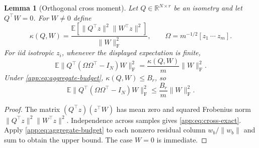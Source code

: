 \documentclass[11pt,a4paper]{article}
\newtheorem{lemma}[theorem]{Lemma}
\theoremstyle{definition}\newtheorem{definition}[theorem]{Definition}
\theoremstyle{remark}\newtheorem{remark}[theorem]{Remark}
\numberwithin{equation}{section}
\newcommand{\R}{\mathbb R}\newcommand{\E}{\mathbb E}\newcommand{\Pp}{\mathbb P}
\newcommand{\Id}{I}\newcommand{\F}{\mathrm F}
\newcommand{\norm}[1]{\lVert#1\rVert}\newcommand{\ip}[2]{\langle#1,#2\rangle}
\begin{document}
\begin{lemma}[Orthogonal cross moment]\label{app:lem:cross}
Let $Q\in\R^{N\times r}$ be an isometry and let $Q^\top W=0$.
For $W\ne0$ define
\begin{equation}\label{app:eq:mixed-parameter}
 \kappa(Q,W)=
 \frac{\E[\norm{Q^\top z}^2\norm{W^\top z}^2]}{\norm W_\F^2},
 \qquad \Omega=m^{-1/2}[z_1\ \cdots\ z_m].
\end{equation}
For iid isotropic $z_i$, whenever the displayed expectation is finite,
\begin{equation}\label{app:eq:cross-exact}
 \E\norm{Q^\top(\Omega\Omega^\top-\Id_N)W}_\F^2
 =\frac{\kappa(Q,W)}m\norm W_\F^2.
\end{equation}
Under \eqref{app:eq:aggregate-budget}, $\kappa(Q,W)\le B_r$, so
\begin{equation}\label{app:eq:cross}
 \E\norm{Q^\top(\Omega\Omega^\top-\Id_N)W}_\F^2
 \le\frac{B_r}{m}\norm W_\F^2.
\end{equation}
\end{lemma}
\begin{proof}
The matrix $(Q^\top z)(z^\top W)$ has mean zero and squared Frobenius
norm $\norm{Q^\top z}^2\norm{W^\top z}^2$. Independence across samples
gives \eqref{app:eq:cross-exact}. Apply \eqref{app:eq:aggregate-budget} to each nonzero residual
column $w_b/\norm{w_b}$ and sum to obtain the upper bound.
The case $W=0$ is immediate.
\end{proof}
\end{document}

